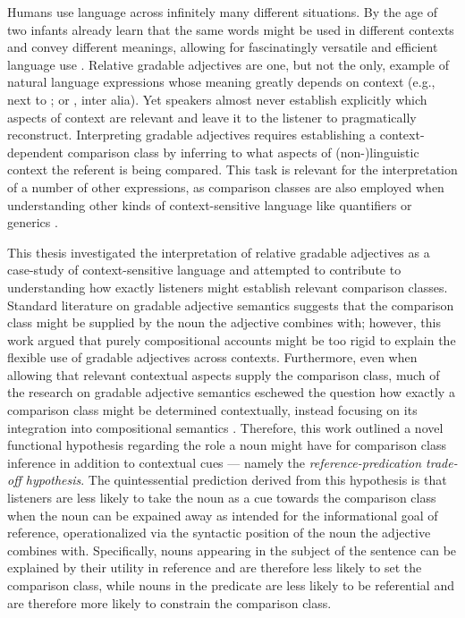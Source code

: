 Humans use language across infinitely many different situations. By the age of two infants already learn that the same words might be used in different contexts and convey different meanings, allowing for fascinatingly versatile and efficient language use \parencite{Mintz2002, ebeling1994children}. 
Relative gradable adjectives are one, but not the only, example of natural language expressions whose meaning greatly depends on context (e.g., next to \textcite[indexicals][]{braun2017}; or \textcite[anaphoras][]{goldberg2017one}, inter alia). Yet speakers almost never establish explicitly which aspects of context are relevant and leave it to the listener to pragmatically reconstruct. Interpreting gradable adjectives requires establishing a context-dependent comparison class by inferring to what aspects of (non-)linguistic context the referent is being compared. This task is relevant for the interpretation of a number of other expressions, as comparison classes are also employed when understanding other kinds of context-sensitive language like quantifiers \parencite[e.g., "John ate \emph{many} of hot dogs",][]{scholler2017semantic} or generics \parencite[e.g., "Dogs are friendly" \emph{[relative to other animals]},][]{tessler2019language}. 

This thesis investigated the interpretation of relative gradable adjectives as a case-study of context-sensitive language and attempted to contribute to understanding how exactly listeners might establish relevant comparison classes. 
Standard literature on gradable adjective semantics suggests that the comparison class might be supplied by the noun the adjective combines with; however, this work argued that purely compositional accounts might be too rigid to explain the flexible use of gradable adjectives across contexts. Furthermore, even when allowing that relevant contextual aspects supply the comparison class, much of the research on gradable adjective semantics eschewed the question how exactly a comparison class might be determined contextually, instead focusing on its integration into compositional semantics \parencite{Kennedy2007, kennedy2012, Kamp1975, Cresswell1976, Solt2009}. 
Therefore, this work outlined a novel functional hypothesis regarding the role a noun might have for comparison class inference in addition to contextual cues --- namely the \emph{reference-predication trade-off hypothesis}. The quintessential prediction derived from this hypothesis is that listeners are less likely to take the noun as a cue towards the comparison class when the noun can be expained away as intended for the informational goal of reference, operationalized via the syntactic position of the noun the adjective combines with. Specifically, nouns appearing in the subject of the sentence can be explained by their utility in reference and are therefore less likely to set the comparison class, while nouns in the predicate are less likely to be referential and are therefore more likely to constrain the comparison class.

